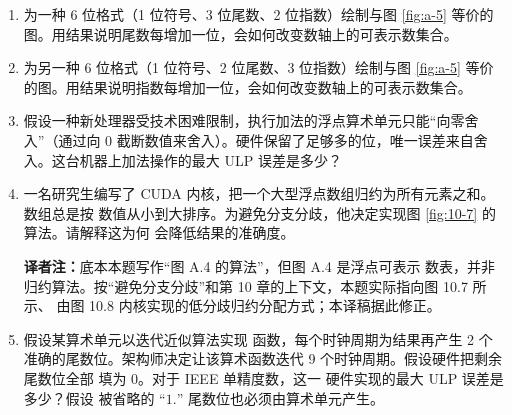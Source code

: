 \begin{enumerate}[label=\arabic*.,leftmargin=2.7em]
  \item 为一种 6 位格式（1 位符号、3 位尾数、2 位指数）绘制与图 \ref{fig:a-5} 等价的
  图。用结果说明尾数每增加一位，会如何改变数轴上的可表示数集合。

  \item 为另一种 6 位格式（1 位符号、2 位尾数、3 位指数）绘制与图 \ref{fig:a-5} 等价
  的图。用结果说明指数每增加一位，会如何改变数轴上的可表示数集合。

  \item 假设一种新处理器受技术困难限制，执行加法的浮点算术单元只能“向零舍入”（通过向
  0 截断数值来舍入）。硬件保留了足够多的位，唯一误差来自舍入。这台机器上加法操作的最大
  ULP 误差是多少？

  \item 一名研究生编写了 CUDA 内核，把一个大型浮点数组归约为所有元素之和。数组总是按
  数值从小到大排序。为避免分支分歧，他决定实现图 \ref{fig:10-7} 的算法。请解释这为何
  会降低结果的准确度。

  \par\noindent\textbf{译者注：}底本本题写作“图 A.4 的算法”，但图 A.4 是浮点可表示
  数表，并非归约算法。按“避免分支分歧”和第 10 章的上下文，本题实际指向图 10.7 所示、
  由图 10.8 内核实现的低分歧归约分配方式；本译稿据此修正。

  \item 假设某算术单元以迭代近似算法实现  函数，每个时钟周期为结果再产生
  2 个准确的尾数位。架构师决定让该算术函数迭代 9 个时钟周期。假设硬件把剩余尾数位全部
  填为 0。对于 IEEE 单精度数，这一  硬件实现的最大 ULP 误差是多少？假设
  被省略的 ``$1.$'' 尾数位也必须由算术单元产生。
\end{enumerate}

